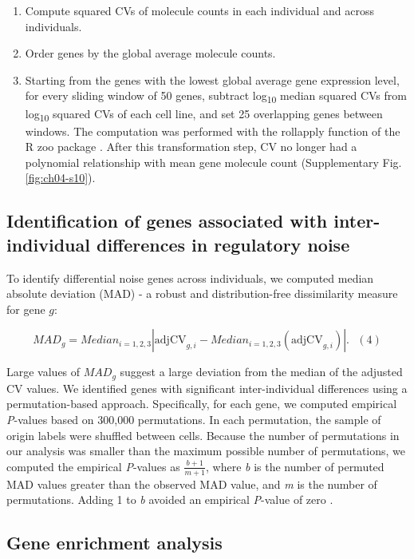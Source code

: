 \begin{enumerate}
\def\labelenumi{\arabic{enumi}.}
\item
  Compute squared CVs of molecule counts in each individual and across
  individuals.
\item
  Order genes by the global average molecule counts.
\item
  Starting from the genes with the lowest global average gene expression
  level, for every sliding window of 50 genes, subtract
  log\textsubscript{10} median squared CVs from log\textsubscript{10}
  squared CVs of each cell line, and set 25 overlapping genes between
  windows. The computation was performed with the rollapply function of
  the R zoo package \citep{Zeileis2005}. After this transformation step,
  CV no longer had a polynomial relationship with mean gene molecule
  count (Supplementary Fig. \ref{fig:ch04-s10}).
\end{enumerate}

\subsection{Identification of genes associated with inter-individual
differences in regulatory
noise}\label{identification-of-genes-associated-with-inter-individual-differences-in-regulatory-noise}

To identify differential noise genes across individuals, we computed
median absolute deviation (MAD) - a robust and distribution-free
dissimilarity measure for gene $g$:

\[ MAD_{g} = Median_{i= 1,2,3} \left| \text{adjCV}_{g,i} -  Median_{i= 1,2,3} ({\text{adjCV}}_{g,i}) \right|. \,\,\,\,(4)\]

Large values of $MAD_{g}$ suggest a large deviation from the median of
the adjusted CV values. We identified genes with significant
inter-individual differences using a permutation-based approach.
Specifically, for each gene, we computed empirical \emph{P}-values based
on 300,000 permutations. In each permutation, the sample of origin
labels were shuffled between cells. Because the number of permutations
in our analysis was smaller than the maximum possible number of
permutations, we computed the empirical \emph{P}-values as
$\frac{b + 1}{m + 1}$, where \emph{b} is the number of permuted MAD
values greater than the observed MAD value, and \emph{m} is the number
of permutations. Adding 1 to \emph{b} avoided an empirical
\emph{P}-value of zero \citep{Phipson2010}.

\subsection{Gene enrichment analysis}\label{gene-enrichment-analysis}

